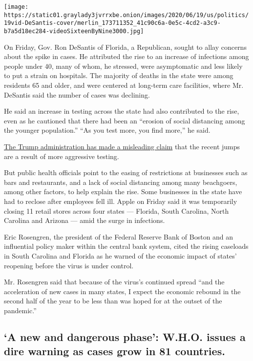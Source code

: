 \texttt{[image: https://static01.graylady3jvrrxbe.onion/images/2020/06/19/us/politics/19vid-DeSantis-cover/merlin\_173711352\_41c90c6a-0e5c-4cd2-a3c9-b7a5d18ec284-videoSixteenByNine3000.jpg]}

On Friday, Gov. Ron DeSantis of Florida, a Republican, sought to allay
concerns about the spike in cases. He attributed the rise to an increase
of infections among people under 40, many of whom, he stressed, were
asymptomatic and less likely to put a strain on hospitals. The majority
of deaths in the state were among residents 65 and older, and were
centered at long-term care facilities, where Mr. DeSantis said the
number of cases was declining.

He said an increase in testing across the state had also contributed to
the rise, even as he cautioned that there had been an ``erosion of
social distancing among the younger population.'' ``As you test more,
you find more,'' he said.

\href{https://www.nytimes3xbfgragh.onion/2020/06/15/us/politics/pence-coronavirus-governors.html}{The
Trump administration has made a misleading claim} that the recent jumps
are a result of more aggressive testing.

But public health officials point to the easing of restrictions at
businesses such as bars and restaurants, and a lack of social distancing
among many beachgoers, among other factors, to help explain the rise.
Some businesses in the state have had to reclose after employees fell
ill. Apple on Friday said it was temporarily closing 11 retail stores
across four states --- Florida, South Carolina, North Carolina and
Arizona --- amid the surge in infections.

Eric Rosengren, the president of the Federal Reserve Bank of Boston and
an influential policy maker within the central bank system, cited the
rising caseloads in South Carolina and Florida as he warned of the
economic impact of states' reopening before the virus is under control.

Mr. Rosengren said that because of the virus's continued spread ``and
the acceleration of new cases in many states, I expect the economic
rebound in the second half of the year to be less than was hoped for at
the outset of the pandemic.''

\hypertarget{a-new-and-dangerous-phase-who-issues-a-dire-warning-as-cases-grow-in-81-countries}{%
\subsection{`A new and dangerous phase': W.H.O. issues a dire warning as
cases grow in 81
countries.}\label{a-new-and-dangerous-phase-who-issues-a-dire-warning-as-cases-grow-in-81-countries}}

